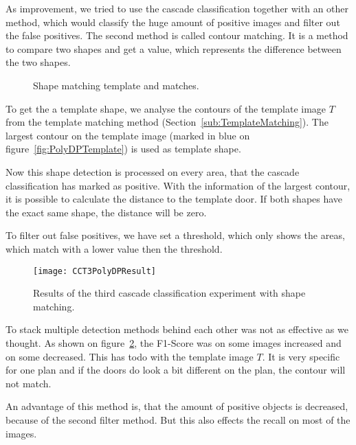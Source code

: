 As improvement, we tried to use the cascade classification together with an other method, which would classify the huge amount of positive images and filter out the false positives. The second method is called contour matching. It is a method to compare two shapes and get a value, which represents the difference between the two shapes.

\begin{figure}[h!]
	\centering
	\hfill
	\hfill
	\caption{Shape matching template and matches.}
	\label{fig:ShapeDistanceMatching}
\end{figure}

To get the a template shape, we analyse the contours of the template image $T$ from the template matching method (Section~\ref{sub:TemplateMatching}). The largest contour on the template image (marked in blue on figure~\ref{fig:PolyDPTemplate}) is used as template shape.

Now this shape detection is processed on every area, that the cascade classification has marked as positive. With the information of the largest contour, it is possible to calculate the distance to the template door. If both shapes have the exact same shape, the distance will be zero.

To filter out false positives, we have set a threshold, which only shows the areas, which match with a lower value then the threshold.

\begin{figure}[H]
	\centering
	\texttt{[image: CCT3PolyDPResult]}
	\caption{Results of the third cascade classification experiment with shape matching.}
	\label{fig:CCT3PolyDPResult}
\end{figure}

To stack multiple detection methods behind each other was not as effective as we thought. As shown on figure~\ref{fig:CCT3PolyDPResult}, the F1-Score was on some images increased and on some decreased. This has todo with the template image $T$. It is very specific for one plan and if the doors do look a bit different on the plan, the contour will not match.

An advantage of this method is, that the amount of positive objects is decreased, because of the second filter method. But this also effects the recall on most of the images.

